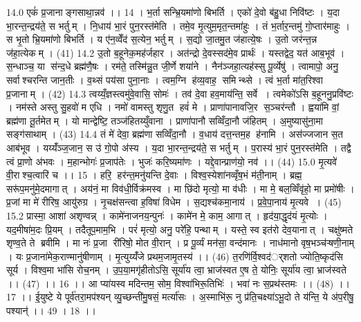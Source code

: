14.0
एकं॑ प्र॒जानाङ्गसाथा॒न्नव॑ ।। 14 ।
भ॒र्ता सन्भ्रि॒यमा॑णो बिभर्ति । एको॑ दे॒वो ब॑हु॒धा निवि॑ष्टः । य॒दा भा॒रन्त॒न्द्रय॑ते॒ स भर्तुम् । नि॒धाय॑ भा॒रं पुन॒रस्त॑मेति । तमे॒व मृ॒त्युम॒मृत॒न्तमा॑हुः । तं भ॒र्तार॒न्तमु॑ गो॒प्तार॑माहुः । स भृ॒तो भ्रि॒यमा॑णो बिभर्ति । य ए॑न॒व्वेँद॑ स॒त्येन॒ भर्तुम् । स॒द्यो जा॒तमु॒त ज॑हात्ये॒षः । उ॒तो जर॑न्त॒न्न ज॑हा॒त्येकम् । (41)
14.2
उ॒तो ब॒हूनेक॒मह॑र्जहार । अत॑न्द्रो दे॒वस्सद॑मे॒व प्रार्थः॑ । यस्तद्वेद॒ यत॑ आब॒भूव॑ । स॒न्धाञ्च॒ या स॑न्द॒धे ब्रह्म॑णै॒षः । रम॑ते॒ तस्मि॑न्नु॒त जी॒र्णे शया॑ने । नैन॑ञ्जहा॒त्यह॑स्सु पू॒र्व्येषु॑ । त्वामापो॒ अनु॒ सर्वाश्चरन्ति जान॒तीः । व॒थ्सं पय॑सा पुना॒नाः । त्वम॒ग्नि ह॑व्य॒वाह॒ समिन्थ्से । त्वं भ॒र्ता मा॑त॒रिश्वा प्र॒जानाम् । (42)
14.3
त्वय्यँ॒ज्ञस्त्वमु॑वे॒वासि॒ सोमः॑ । तव॑ दे॒वा हव॒माय॑न्ति॒ सर्वे । त्वमेको॑ऽसि ब॒हूननु॒प्रवि॑ष्टः । नम॑स्ते अस्तु सु॒हवो॑ म एधि । नमो॑ वामस्तु शृणु॒त हवं॑ मे । प्राणा॑पानावजि॒र स॒ञ्चर॑न्तौ । ह्वया॑मि वां॒ ब्रह्म॑णा तू॒र्तमेतम् । यो मान्द्वेष्टि॒ तञ्ज॑हितय्युँवाना । प्राणा॑पानौ सव्विँदा॒नौ ज॑हितम् । अ॒मुष्यासु॑ना॒मा सङ्ग॑साथाम् । (43)
14.4
तं मे॑ देवा॒ ब्रह्म॑णा सव्विँदा॒नौ । व॒धाय॑ दत्त॒न्तम॒ह ह॑नामि । अस॑ज्जजान स॒त आब॑भूव । यय्यँ॑ञ्ज॒जान॒ स उ॑ गो॒पो अ॑स्य । य॒दा भा॒रन्त॒न्द्रय॑ते॒ स भर्तुम् । प॒रास्य॑ भा॒रं पुन॒रस्त॑मेति । तद्वै त्वं प्रा॒णो अ॑भवः । म॒हान्भोगः॑ प्र॒जाप॑तेः । भुजः॑ करि॒ष्यमा॑णः । यद्दे॒वान्प्राण॑यो॒ नव॑ ।। (44)
15.0
मृ॒त्यवे॑ वी॒राश्च॒त्वारि॑ च ।। 15 ।
हरि॒ हर॑न्त॒मनु॑यन्ति दे॒वाः । विश्व॒स्येशा॑नव्वृँष॒भं म॑ती॒नाम् । ब्रह्म॒ सरू॑प॒मनु॑मे॒दमागात् । अय॑नं॒ मा विव॑धी॒र्विक्र॑मस्व । मा छि॑दो मृत्यो॒ मा व॑धीः । मा मे॒ बल॒व्विँवृ॑हो॒ मा प्रमो॑षीः । प्र॒जां मा मे॑ रीरिष॒ आयु॑रुग्र । नृ॒चक्ष॑सन्त्वा ह॒विषा॑ विधेम । स॒द्यश्च॑कमा॒नाय॑ । प्र॒वे॒पा॒नाय॑ मृ॒त्यवे । (45)
15.2
प्रास्मा॒ आशा॑ अशृण्वन्न् । कामे॑नाजनय॒न्पुनः॑ । कामे॑न मे॒ काम॒ आगात् । हृद॑या॒द्धृद॑यं मृ॒त्योः । यद॒मीषा॑म॒दः प्रि॒यम् । तदैतूप॒माम॒भि । परं॑ मृत्यो॒ अनु॒ परे॑हि॒ पन्थाम् । यस्ते॒ स्व इत॑रो देव॒यानात् । चक्षु॑ष्मते शृण्व॒ते ते ब्रवीमि । मा नः॑ प्र॒जा री॑रिषो॒ मोत वी॒रान् । प्र पू॒र्व्यं मन॑सा॒ वन्द॑मानः । नाध॑मानो वृष॒भञ्च॑ऱ्षणी॒नाम् । यः प्र॒जाना॑मेक॒राण्मानु॑षीणाम् । मृ॒त्युय्यँ॑जे प्रथम॒जामृ॒तस्य॑ ।। (46)
त॒रणि॑र्वि॒श्वद॑र््शतो ज्योति॒ष्कृद॑सि सूर्य । विश्व॒मा भा॑सि रोच॒नम् । उ॒प॒या॒मगृ॑हीतोऽसि॒ सूर्या॑य त्वा॒ भ्राज॑स्वत ए॒ष ते॒ योनिः॒ सूर्या॑य त्वा॒ भ्राज॑स्वते ।। (47) ।। 16 ।।
आ प्या॑यस्व मदिन्तम॒ सोम॒ विश्वा॑भिरू॒तिभिः॑ । भवा॑ नः स॒प्रथ॑स्तमः ।। (48) ।। 17 ।।
ई॒युष्टे ये पूर्व॑तरा॒मप॑श्यन् व्यु॒च्छन्ती॑मु॒षसं॒ मर्त्या॑सः । अ॒स्माभि॑रू॒ नु प्र॑ति॒चक्ष्या॑ऽभू॒दो ते य॑न्ति॒ ये अ॑प॒रीषु॒ पश्यान्॑ ।। 49 । 18 ।।

